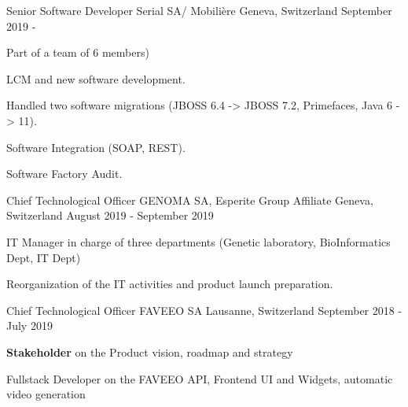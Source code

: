 

\begin{cventries}
        \cventry
        {Senior Software Developer} %
        {Serial SA/ Mobilière} %
        {Geneva, Switzerland} %
        {September 2019 - } %
        {
            \begin{cvitems} %
                \item{Part of a team of 6 members)}
                \item{LCM and new software development.}
                \item{Handled two software migrations (JBOSS 6.4 -> JBOSS 7.2, Primefaces, Java 6 -> 11).}
                \item{Software Integration (SOAP, REST).}
                \item{Software Factory Audit.}
            \end{cvitems}
        }
        \cventry
        {Chief Technological Officer} %
        {GENOMA SA, Esperite Group Affiliate} %
        {Geneva, Switzerland} %
        {August 2019 - September 2019 } %
        {
            \begin{cvitems} %
                \item{IT Manager in charge of three departments (Genetic laboratory, BioInformatics Dept, IT Dept)}
                \item{Reorganization of the IT activities and product launch preparation.}
            \end{cvitems}
        }
    \cventry
    {Chief Technological Officer} %
    {FAVEEO SA} %
    {Lausanne, Switzerland} %
    {September 2018 - July 2019} %
    {
        \begin{cvitems} %
            \item{\textbf{Stakeholder} on the Product vision, roadmap and strategy}
            \item{Fullstack Developer on the FAVEEO API, Frontend UI and Widgets, automatic video generation}

\end{cvitems}}
\end{cventries}
